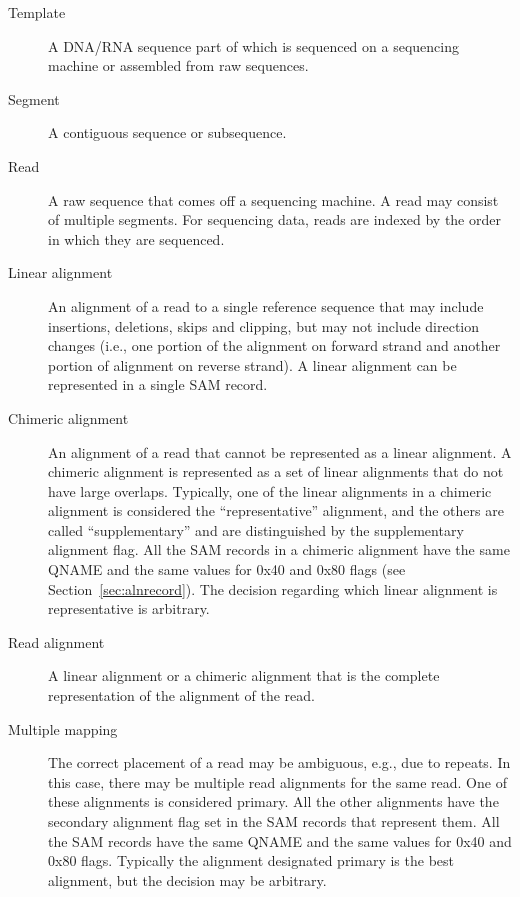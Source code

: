 \documentclass[10pt]{article}
\begin{document}
\begin{description}
\item[Template] A DNA/RNA sequence part of which is sequenced on a
  sequencing machine or assembled from raw sequences.

\item[Segment] A contiguous sequence or subsequence.

\item[Read] A raw sequence that comes off a sequencing machine. A read
  may consist of multiple segments. For sequencing data, reads are indexed by
  the order in which they are sequenced.

\item[Linear alignment]
  An alignment of a read to a single reference sequence that may include
  insertions, deletions, skips and clipping, but may not include direction
  changes (i.e., one portion of the alignment on forward strand and another
  portion of alignment on reverse strand). A linear alignment can be
  represented in a single SAM record.

\item[Chimeric alignment]
  An alignment of a read that cannot be represented as a linear alignment. A
  chimeric alignment is represented as a set of linear alignments that do not
  have large overlaps.  Typically, one of the linear alignments in a chimeric
  alignment is considered the ``representative'' alignment, and the others are
  called ``supplementary'' and are distinguished by the supplementary alignment
  flag.  All the SAM records in a chimeric alignment have the same {\sf QNAME}
  and the same values for 0x40 and 0x80 flags (see Section~\ref{sec:alnrecord}).
  The decision regarding which linear alignment is representative is arbitrary.

\item[Read alignment]
  A linear alignment or a chimeric alignment that is the complete
  representation of the alignment of the read.

\item[Multiple mapping]
  The correct placement of a read may be ambiguous, e.g., due to repeats.  In
  this case, there may be multiple read alignments for the same read.  One of
  these alignments is considered primary.  All the other alignments have the
  secondary alignment flag set in the SAM records that represent them.  All the
  SAM records have the same {\sf QNAME} and the same values for 0x40 and 0x80
  flags.  Typically the alignment designated primary is the best alignment, but
  the decision may be arbitrary.\footnotemark


\end{description}
\end{document}
